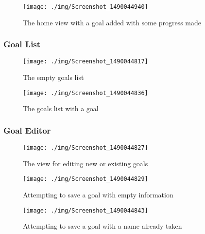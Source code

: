\documentclass[report.tex]{subfiles}
\begin{document}
\begin{figure}[H]
    \centering
    \texttt{[image: ./img/Screenshot\_1490044940]}
    \caption{The home view with a goal added with some progress made}
\end{figure}

\subsubsection{Goal List} %
\label{ssub:goal_list}
\begin{figure}[H]
    \centering
    \texttt{[image: ./img/Screenshot\_1490044817]}
    \caption{The empty goals list}
\end{figure}

\begin{figure}[H]
    \centering
    \texttt{[image: ./img/Screenshot\_1490044836]}
    \caption{The goals list with a goal}
\end{figure}

\subsubsection{Goal Editor} %
\label{ssub:goal_editor}
\begin{figure}[H]
    \centering
    \texttt{[image: ./img/Screenshot\_1490044827]}
    \caption{The view for editing new or existing goals}
\end{figure}

\begin{figure}[H]
    \centering
    \texttt{[image: ./img/Screenshot\_1490044829]}
    \caption{Attempting to save a goal with empty information}
\end{figure}

\begin{figure}[H]
    \centering
    \texttt{[image: ./img/Screenshot\_1490044843]}
    \caption{Attempting to save a goal with a name already taken}
\end{figure}

\newpage
\end{document}
